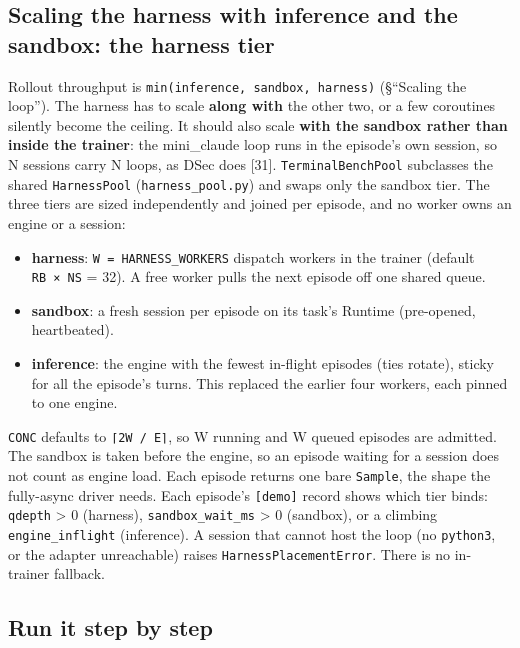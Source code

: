 \documentclass[
  paper=a4,
  ,captions=tableheading
]{scrartcl}
\providecommand{\tightlist}{%
  \setlength{\itemsep}{0pt}\setlength{\parskip}{0pt}}
\begin{document}
\hypertarget{scaling-the-harness-with-inference-and-the-sandbox-the-harness-tier}{%
\subsection{Scaling the harness with inference and the sandbox: the
harness
tier}\label{scaling-the-harness-with-inference-and-the-sandbox-the-harness-tier}}

Rollout throughput is \texttt{min(inference,\ sandbox,\ harness)}
(§``Scaling the loop''). The harness has to scale \textbf{along with}
the other two, or a few coroutines silently become the ceiling. It
should also scale \textbf{with the sandbox rather than inside the
trainer}: the mini\_claude loop runs in the episode's own session, so N
sessions carry N loops, as DSec does {[}31{]}.
\texttt{TerminalBenchPool} subclasses the shared \texttt{HarnessPool}
(\texttt{harness\_pool.py}) and swaps only the sandbox tier. The three
tiers are sized independently and joined per episode, and no worker owns
an engine or a session:

\begin{itemize}
\tightlist
\item
  \textbf{harness}: \texttt{W\ =\ HARNESS\_WORKERS} dispatch workers in
  the trainer (default \texttt{RB\ ×\ NS} = 32). A free worker pulls the
  next episode off one shared queue.
\item
  \textbf{sandbox}: a fresh session per episode on its task's Runtime
  (pre-opened, heartbeated).
\item
  \textbf{inference}: the engine with the fewest in-flight episodes
  (ties rotate), sticky for all the episode's turns. This replaced the
  earlier four workers, each pinned to one engine.
\end{itemize}

\texttt{CONC} defaults to \texttt{⌈2W\ /\ E⌉}, so W running and W queued
episodes are admitted. The sandbox is taken before the engine, so an
episode waiting for a session does not count as engine load. Each
episode returns one bare \texttt{Sample}, the shape the fully-async
driver needs. Each episode's \texttt{{[}demo{]}} record shows which tier
binds: \texttt{qdepth} \textgreater{} 0 (harness),
\texttt{sandbox\_wait\_ms} \textgreater{} 0 (sandbox), or a climbing
\texttt{engine\_inflight} (inference). A session that cannot host the
loop (no \texttt{python3}, or the adapter unreachable) raises
\texttt{HarnessPlacementError}. There is no in-trainer fallback.

\hypertarget{run-it-step-by-step}{%
\subsection{Run it step by step}\label{run-it-step-by-step}}
\end{document}
